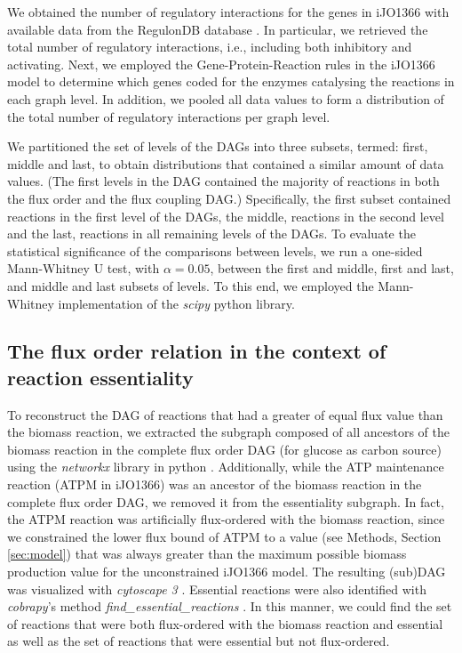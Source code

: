 \documentclass[12pt]{article}
\begin{document}
We obtained the number of regulatory interactions for the genes in iJO1366 with available data from the RegulonDB database \cite{Gama-Castro2016}. In particular, we retrieved the total number of regulatory interactions, i.e., including both inhibitory and activating. Next, we employed the Gene-Protein-Reaction rules in the iJO1366 model to determine which genes coded for the enzymes catalysing the reactions in each graph level. In addition, we pooled all data values to form a distribution of the total number of regulatory interactions per graph level.

We partitioned the set of levels of the DAGs into three subsets, termed: first, middle and last, to obtain distributions that contained a similar amount of data values. (The first levels in the DAG contained the majority of reactions in both the flux order and the flux coupling DAG.) Specifically, the first subset contained reactions in the first level of the DAGs, the middle, reactions in the second level and the last, reactions in all remaining levels of the DAGs. To evaluate the statistical significance of the comparisons between levels, we run a one-sided Mann-Whitney U test, with $\alpha=0.05$, between the first and middle, first and last, and middle and last subsets of levels. To this end, we employed the Mann-Whitney implementation of the \emph{scipy} python library.

\subsection{The flux order relation in the context of reaction essentiality}
\label{subsection:essentiality}
To reconstruct the DAG of reactions that had a greater of equal flux value than the biomass reaction, we extracted the subgraph composed of all ancestors of the biomass reaction in the complete flux order DAG (for glucose as carbon source) using the \emph{networkx} library in python \cite{Hagberg2008}. Additionally, while the ATP maintenance reaction (ATPM in iJO1366) was an ancestor of the biomass reaction in the complete flux order DAG, we removed it from the essentiality subgraph. In fact, the ATPM reaction was artificially flux-ordered with the biomass reaction, since we constrained the lower flux bound of ATPM to a value (see Methods, Section \ref{sec:model}) that was always greater than the maximum possible biomass production value for the unconstrained iJO1366 model. The resulting (sub)DAG was visualized with \emph{cytoscape 3} \cite{Su2014}. Essential reactions were also identified with \emph{cobrapy}'s method \emph{find\_essential\_reactions} \cite{Ebrahim2013}. In this manner, we could find the set of reactions that were both flux-ordered with the biomass reaction and essential as well as the set of reactions that were essential but not flux-ordered.


\end{document}
